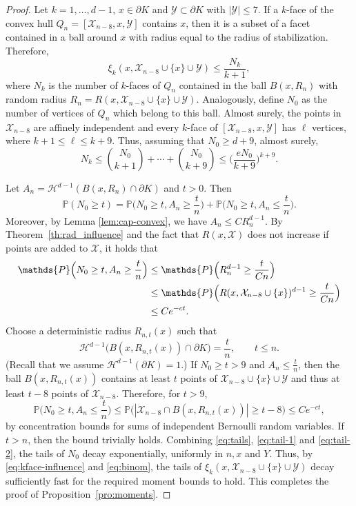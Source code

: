 \documentclass[12pt]{article}
\newcommand{\IP}{\mathds{P}}
\def\cH{{\mathcal H}}
\def\cX{{\mathcal X}}
\def\cY{{\mathcal Y}}
\def\bd{{\partial}}
\theoremstyle{definition}
\begin{document}
\begin{proof}
	Let $k=1,\dots,d-1$, $x\in \partial K$ and $\cY\subset \partial K$ with $|\cY|\le 7$. If a $k$-face of the convex hull $Q_n=[\cX_{n-8},x,\cY]$ contains $x$, then it is a subset of a facet contained in a ball around $x$ with radius equal to the radius of stabilization. Therefore,
	\begin{equation}\label{eq:kface-influence}
	\xi_k(x,\cX_{n-8}\cup \{x\}\cup \cY)
	\le \frac{N_k}{k+1},
	\end{equation}
	where $N_k$ is the number of $k$-faces of $Q_n$ contained in the ball $B(x,R_n)$ with random radius $R_n=R(x,\cX_{n-8}\cup \{x\}\cup \cY)$. Analogously, define $N_0$ as the number of vertices of $Q_n$ which belong to this ball.  Almost surely, the points in $\cX_{n-8}$ are affinely independent and every $k$-face of $[\cX_{n-8},x,\cY]$ has $\ell$ vertices, where $k+1\le \ell\le k+9$. Thus, assuming that $N_0\ge d+9$, almost surely, 
	\begin{equation} \label{eq:binom}
	N_k
	\le \binom{ N_0 }{k+1}+\cdots+\binom{ N_0 }{k+9}
	\le \Big(\frac{e N_0}{k+9}\Big)^{k+9}.
	\end{equation}

	Let $A_n=\cH^{d-1}(B(x,R_n)\cap \partial K)$ and $t>0$. Then
	\begin{equation}\label{eq:tails}
	\IP(N_0\ge t)
	= \IP\Big(N_0\ge t, A_n\ge \frac{t}{n}\Big)
	+ \IP\Big(N_0\ge t, A_n\le \frac{t}{n}\Big).
	\end{equation}
	Moreover, by Lemma \ref{lem:cap-convex}, we have $A_n\le C R_n^{d-1}$. By Theorem~\ref{th:rad_influence} and the fact that $R(x,\cX)$ does not increase if points are added to $\cX$, it holds that
	\begin{align}
	\IP\Big(N_0\ge t, A_n\ge \frac{t}{n}\Big)\notag
	&\le \IP\Big(R_n^{d-1}\ge \frac{t}{C n}\Big)\\ \notag
	&\le \IP\Big(R(x,\cX_{n-8}\cup \{x\})^{d-1}\ge \frac{t}{C n}\Big)\\  
	&\le Ce^{-ct}.\label{eq:tail-1}
	\end{align}
	Choose a deterministic radius $R_{n,t}(x)$ such that 
	\[
	\cH^{d-1}\big(B(x,R_{n,t}(x))\cap \bd K \big)=\frac{t}{n},\qquad t\le n.
	\]
	(Recall that we assume $\cH^{d-1}(\partial K)=1$.)
	If $N_0\ge t>9$ and $A_n\le \frac{t}{n}$, then the ball $B(x,R_{n,t}(x))$ contains at least $t$ points of $\cX_{n-8}\cup \{x\}\cup \cY$ and thus at least $t-8$ points of $\cX_{n-8}$. Therefore, for $t>9$,
	\begin{equation}\label{eq:tail-2}
	\IP\Big(N_0\ge t, A_n\le \frac{t}{n}\Big)
	\le \IP\big(|\cX_{n-8}\cap B(x,R_{n,t}(x))|\ge t-8\big)
	\le Ce^{-ct},
	\end{equation}
	by concentration bounds for sums of independent Bernoulli random variables. If $t>n$, then the bound trivially holds. Combining \eqref{eq:tails}, \eqref{eq:tail-1} and \eqref{eq:tail-2}, the tails of $N_0$ decay exponentially, uniformly in $n,x$ and $Y$. Thus, by \eqref{eq:kface-influence} and \eqref{eq:binom}, the tails of $\xi_k(x,\cX_{n-8}\cup \{x\}\cup \cY)$ decay sufficiently fast for the required moment bounds to hold. This completes the proof of Proposition~\ref{pro:moments}.
\end{proof}
\end{document}
